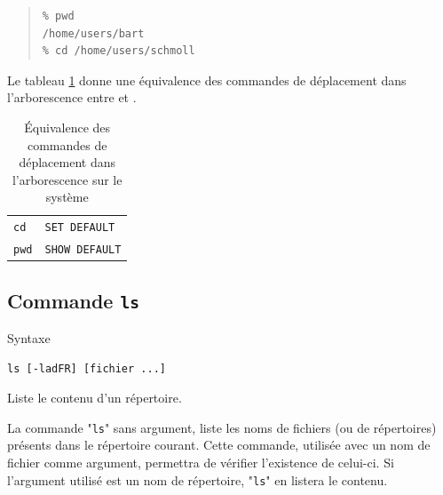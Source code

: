 \begin{example}
\begin{quote}
\begin{verbatim}
% pwd
/home/users/bart
% cd /home/users/schmoll
\end{verbatim}
\end{quote}
\end{example}

Le tableau \ref{tab-cmds-pwdcd} donne une {\'e}quivalence des commandes de
d{\'e}placement dans l'arborescence entre {\Unix} et {\OpenVMS}
.

\begin{table}[hbtp]
\centering
\begin{tabular}{|l|l|}
	\hline
	{\Unix}	&	{\OpenVMS}		\\
	\hline \hline
	{\tt cd}	&	{\tt SET DEFAULT}	\\
	\hline
	{\tt pwd}	&	{\tt SHOW DEFAULT}	\\
	\hline
\end{tabular}
\caption{\label{tab-cmds-pwdcd}\'{E}quivalence des commandes de d{\'e}placement
dans l'arborescence sur le syst{\`e}me}
\end{table}


\subsection{\label{cmds-unix-ls}Commande {\tt ls}}

\begin{definition}{Syntaxe}
\begin{verbatim}
ls [-ladFR] [fichier ...]
\end{verbatim}
Liste le contenu d'un r{\'e}pertoire.
\end{definition}

La commande "{\tt ls}" sans argument, liste les noms de fichiers (ou
de r{\'e}pertoires) pr{\'e}sents dans le r{\'e}pertoire courant. Cette commande,
utilis{\'e}e avec un nom de fichier comme argument, permettra de v{\'e}rifier
l'existence de celui-ci. Si l'argument utilis{\'e} est un nom de r{\'e}pertoire,
"{\tt ls}" en listera le contenu.

